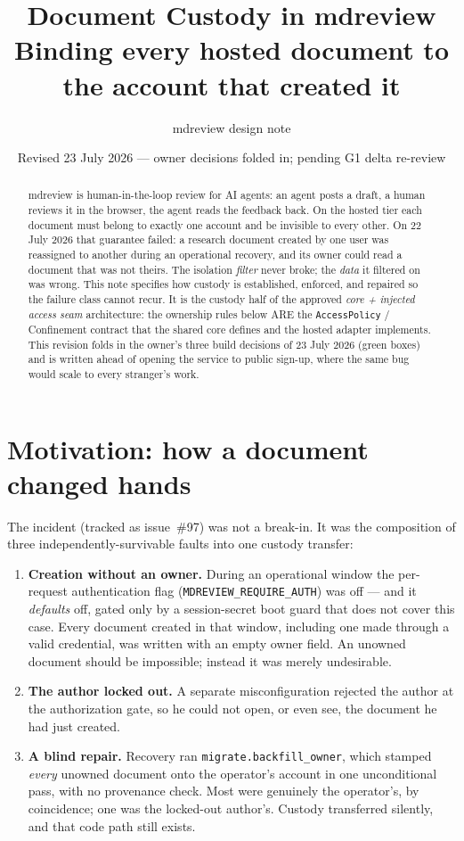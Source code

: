 \documentclass[11pt]{article}
\title{\textbf{Document Custody in mdreview}\\[2pt]
\large Binding every hosted document to the account that created it}
\author{mdreview design note}
\date{Revised 23 July 2026 --- owner decisions folded in; pending G1 delta re-review}
\begin{document}
\maketitle

\begin{abstract}
mdreview is human-in-the-loop review for AI agents: an agent posts a draft, a human reviews it
in the browser, the agent reads the feedback back. On the hosted tier each document must belong
to exactly one account and be invisible to every other. On 22 July 2026 that guarantee failed:
a research document created by one user was reassigned to another during an operational
recovery, and its owner could read a document that was not theirs. The isolation \emph{filter}
never broke; the \emph{data} it filtered on was wrong. This note specifies how custody is
established, enforced, and repaired so the failure class cannot recur. It is the custody half of
the approved \emph{core + injected access seam} architecture: the ownership rules below ARE the
\texttt{AccessPolicy} / Confinement contract that the shared core defines and the hosted adapter
implements. This revision folds in the owner's three build decisions of 23 July 2026 (green
boxes) and is written ahead of opening the service to public sign-up, where the same bug would
scale to every stranger's work.
\end{abstract}

\section{Motivation: how a document changed hands}
\label{sec:motivation}

The incident (tracked as issue~\#97) was not a break-in. It was the composition of three
independently-survivable faults into one custody transfer:

\begin{enumerate}[leftmargin=1.6em]
  \item \textbf{Creation without an owner.} During an operational window the per-request
  authentication flag (\texttt{MDREVIEW\_REQUIRE\_AUTH}) was off --- and it \emph{defaults} off,
  gated only by a session-secret boot guard that does not cover this case. Every document created
  in that window, including one made through a valid credential, was written with an empty owner
  field. An unowned document should be impossible; instead it was merely undesirable.
  \item \textbf{The author locked out.} A separate misconfiguration rejected the author at the
  authorization gate, so he could not open, or even see, the document he had just created.
  \item \textbf{A blind repair.} Recovery ran \texttt{migrate.backfill\_owner}, which stamped
  \emph{every} unowned document onto the operator's account in one unconditional pass, with no
  provenance check. Most were genuinely the operator's, by coincidence; one was the locked-out
  author's. Custody transferred silently, and that code path still exists.
\end{enumerate}
\end{document}
